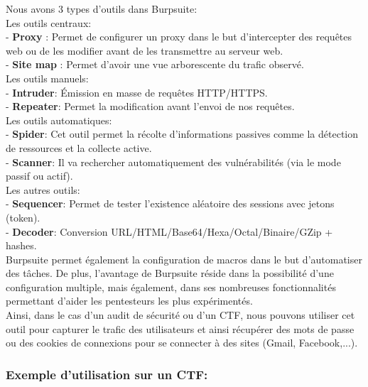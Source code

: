 \noindent Nous avons 3 types d’outils dans Burpsuite:\\

\noindent Les outils centraux:\\
- \textbf{Proxy} : Permet de configurer un proxy dans le but d’intercepter des requêtes web ou de les modifier avant de les transmettre au serveur web.\\
- \textbf{Site map} : Permet d’avoir une vue arborescente du trafic observé.\\


\noindent Les outils manuels:\\
- \textbf{Intruder}: Émission en masse de requêtes HTTP/HTTPS.\\
- \textbf{Repeater}: Permet la modification avant l’envoi de nos requêtes.\\

\noindent Les outils automatiques:\\
- \textbf{Spider}: Cet outil permet la récolte d’informations passives comme la détection de ressources et la collecte active.\\
- \textbf{Scanner}: Il va rechercher automatiquement des vulnérabilités (via le mode passif ou actif).\\

\noindent Les autres outils:\\
- \textbf{Sequencer}: Permet de  tester l'existence aléatoire des sessions avec jetons (token).\\
- \textbf{Decoder}: Conversion URL/HTML/Base64/Hexa/Octal/Binaire/GZip + hashes.\\

Burpsuite permet également la configuration de macros dans le but d’automatiser des tâches. De plus, l’avantage de Burpsuite réside dans la possibilité d’une configuration multiple, mais également, dans ses nombreuses fonctionnalités permettant d’aider les pentesteurs les plus expérimentés.\\

Ainsi, dans le cas d’un audit de sécurité ou d’un CTF, nous pouvons utiliser cet outil pour capturer le trafic des utilisateurs et ainsi récupérer des mots de passe ou des cookies de connexions pour se connecter à des sites (Gmail, Facebook,...).\\

\subsubsection{Exemple d’utilisation sur un CTF:}

